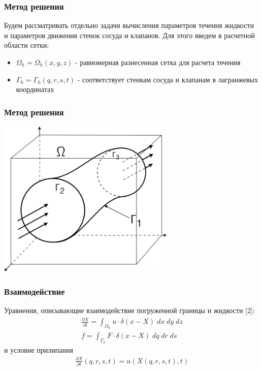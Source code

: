 \documentclass[14pt]{beamer}
\begin{document}
\begin{frame}
\frametitle{Метод решения}
Будем рассматривать отдельно задачи вычисления параметров течения жидкости и параметров движения стенок сосуда и клапанов. Для этого введем в расчетной области сетки:
\begin{itemize}
    \item $\Omega_h = \Omega_h(x, y, z)$ - равномерная разнесенная сетка для расчета течения
    \item $\Gamma_h = \Gamma_h(q, r, s, t)$ - соответствует стенкам сосуда и клапанам в лагранжевых координатах
\end{itemize}

\end{frame}

\begin{frame}
\frametitle{Метод решения}
    \begin{center}
        \includegraphics[width=8.5cm]{area_ibm_3d.png}
    \end{center}
\end{frame}

\begin{frame}
\frametitle{Взаимодействие}
Уравнения, описывающие взаимодействие погруженной границы и жидкости [2]:
\begin{gather}
    \label{eq:ibm_velocity}
    \frac{\partial X}{\partial t} = \int_{\Omega_h} u \cdot \delta (x - X)\; dx\; dy\; dz \\
    \label{eq:ibm_force}
    f = \int_{\Gamma_h} F \cdot \delta (x - X)\; dq\; dr\; ds
\end{gather}
и условие прилипания
\begin{gather}
    \label{eq:no_slip}
    \frac{\partial X}{\partial t} (q, r, s, t) = u(X(q, r, s, t), t)
\end{gather}
\end{frame}
\end{document}
